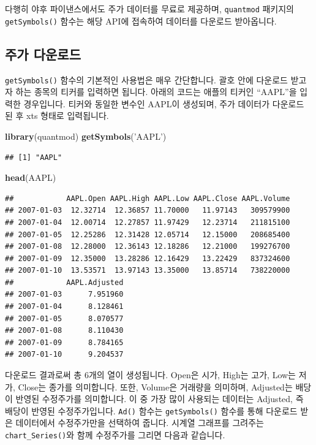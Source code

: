 \documentclass[]{book}
\newenvironment{Shaded}{\begin{snugshade}}{\end{snugshade}}
\newcommand{\KeywordTok}[1]{\textcolor[rgb]{0.13,0.29,0.53}{\textbf{#1}}}
\newcommand{\NormalTok}[1]{#1}
\newcommand{\StringTok}[1]{\textcolor[rgb]{0.31,0.60,0.02}{#1}}
\begin{document}
다행히 야후 파이낸스에서도 주가 데이터를 무료로 제공하며, \texttt{quantmod} 패키지의 \texttt{getSymbols()} 함수는 해당 API에 접속하여 데이터를 다운로드 받아옵니다.

\hypertarget{section-10}{%
\subsection{주가 다운로드}\label{section-10}}

\texttt{getSymbols()} 함수의 기본적인 사용법은 매우 간단합니다. 괄호 안에 다운로드 받고자 하는 종목의 티커를 입력하면 됩니다. 아래의 코드는 애플의 티커인 ``AAPL''을 입력한 경우입니다. 티커와 동일한 변수인 AAPL이 생성되며, 주가 데이터가 다운로드 된 후 xts 형태로 입력됩니다.

\begin{Shaded}
\begin{Highlighting}[]
\KeywordTok{library}\NormalTok{(quantmod)}
\KeywordTok{getSymbols}\NormalTok{(}\StringTok{'AAPL'}\NormalTok{)}
\end{Highlighting}
\end{Shaded}

\begin{verbatim}
## [1] "AAPL"
\end{verbatim}

\begin{Shaded}
\begin{Highlighting}[]
\KeywordTok{head}\NormalTok{(AAPL)}
\end{Highlighting}
\end{Shaded}

\begin{verbatim}
##            AAPL.Open AAPL.High AAPL.Low AAPL.Close AAPL.Volume
## 2007-01-03  12.32714  12.36857 11.70000   11.97143   309579900
## 2007-01-04  12.00714  12.27857 11.97429   12.23714   211815100
## 2007-01-05  12.25286  12.31428 12.05714   12.15000   208685400
## 2007-01-08  12.28000  12.36143 12.18286   12.21000   199276700
## 2007-01-09  12.35000  13.28286 12.16429   13.22429   837324600
## 2007-01-10  13.53571  13.97143 13.35000   13.85714   738220000
##            AAPL.Adjusted
## 2007-01-03      7.951960
## 2007-01-04      8.128461
## 2007-01-05      8.070577
## 2007-01-08      8.110430
## 2007-01-09      8.784165
## 2007-01-10      9.204537
\end{verbatim}

다운로드 결과로써 총 6개의 열이 생성됩니다. Open은 시가, High는 고가, Low는 저가, Close는 종가를 의미합니다. 또한, Volume은 거래량을 의미하며, Adjusted는 배당이 반영된 수정주가를 의미합니다. 이 중 가장 많이 사용되는 데이터는 Adjusted, 즉 배당이 반영된 수정주가입니다. \texttt{Ad()} 함수는 \texttt{getSymbols()} 함수를 통해 다운로드 받은 데이터에서 수정주가만을 선택하여 줍니다. 시계열 그래프를 그려주는 \texttt{chart\_Series()}와 함께 수정주가를 그리면 다음과 같습니다.
\end{document}

